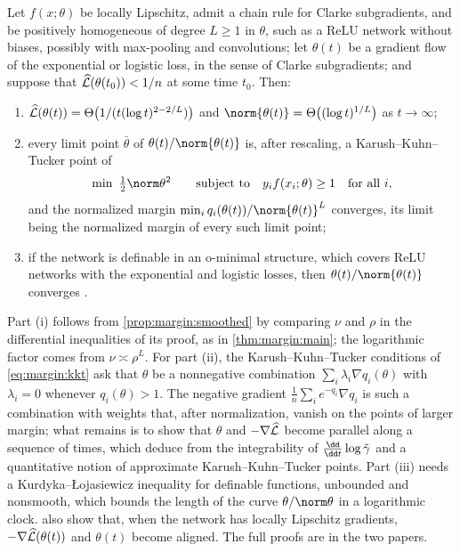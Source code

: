\begin{refsection}
\begin{theorem}\label{thm:margin:lyuli}
Let $f(x;\theta)$ be locally Lipschitz, admit a chain rule for Clarke subgradients, and be positively homogeneous of degree $L\ge1$ in $\theta$, such as a ReLU network without biases, possibly with max-pooling and convolutions; let $\theta(t)$ be a gradient flow of the exponential or logistic loss, in the sense of Clarke subgradients; and suppose that $\widehat{\mathcal{L}}(\theta(t_0))<1/n$ at some time $t_0$. Then:
\begin{enumerate}
\item $\widehat{\mathcal{L}}(\theta(t))=\Theta\bigl(1/(t(\log t)^{2-2/L})\bigr)$ and $\norm{\theta(t)}=\Theta\bigl((\log t)^{1/L}\bigr)$ as $t\to\infty$;
\item every limit point $\bar\theta$ of $\theta(t)/\norm{\theta(t)}$ is, after rescaling, a Karush--Kuhn--Tucker point of
\begin{equation}\label{eq:margin:kkt}
  \min\ \tfrac12\norm\theta^2\qquad\text{subject to}\quad y_if(x_i;\theta)\ge1\quad\text{for all }i ,
\end{equation}
and the normalized margin $\min_iq_i(\theta(t))/\norm{\theta(t)}^L$ converges, its limit being the normalized margin of every such limit point;
\item if the network is definable in an o-minimal structure, which covers ReLU networks with the exponential and logistic losses, then $\theta(t)/\norm{\theta(t)}$ converges \parencite{JiTelgarsky2020}.
\end{enumerate}
\end{theorem}

\begin{proofsketch}
Part (i) follows from \cref{prop:margin:smoothed} by comparing $\nu$ and $\rho$ in the differential inequalities of its proof, as in \cref{thm:margin:main}; the logarithmic factor comes from $\nu\asymp\rho^L$. For part (ii), the Karush--Kuhn--Tucker conditions of \eqref{eq:margin:kkt} ask that $\theta$ be a nonnegative combination $\sum_i\lambda_i\nabla q_i(\theta)$ with $\lambda_i=0$ whenever $q_i(\theta)>1$. The negative gradient $\frac1n\sum_ie^{-q_i}\nabla q_i$ is such a combination with weights that, after normalization, vanish on the points of larger margin; what remains is to show that $\theta$ and $-\nabla\widehat{\mathcal{L}}$ become parallel along a sequence of times, which \textcite{LyuLi2020} deduce from the integrability of $\frac{\dd}{\dd t}\log\marginsm$ and a quantitative notion of approximate Karush--Kuhn--Tucker points. Part (iii) needs a Kurdyka--{\L}ojasiewicz inequality for definable functions, unbounded and nonsmooth, which bounds the length of the curve $\theta/\norm\theta$ in a logarithmic clock. \Textcite{JiTelgarsky2020} also show that, when the network has locally Lipschitz gradients, $-\nabla\widehat{\mathcal{L}}(\theta(t))$ and $\theta(t)$ become aligned. The full proofs are in the two papers.
\end{proofsketch}


\end{refsection}
